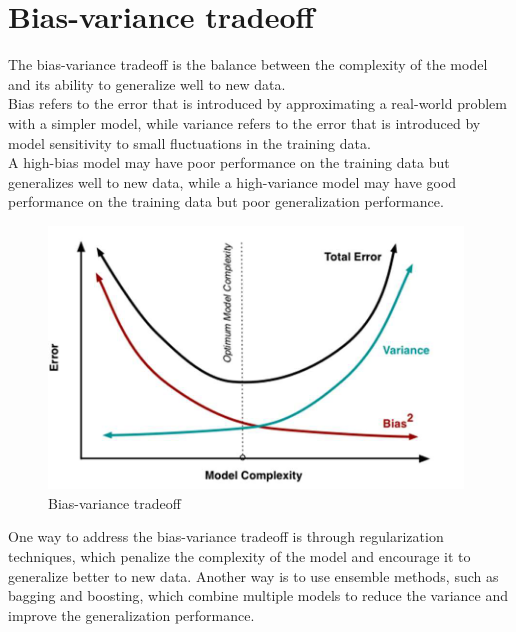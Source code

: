 \documentclass{article}
\begin{document}
\section{Bias-variance tradeoff}
The bias-variance tradeoff is the balance between the complexity of the model and its ability to generalize well to new data.\\
Bias refers to the error that is introduced by approximating a real-world problem with a simpler model, while variance refers to the error that is introduced by model sensitivity to small fluctuations in the training data.\\
A high-bias model may have poor performance on the training data but generalizes well to new data, while a high-variance model may have good performance on the training data but poor generalization performance.\\
\begin{figure}[!ht]
    \centering
    \includegraphics[width=11cm]{./images/p118_img552.png}
    \caption{Bias-variance tradeoff}
\end{figure}

\noindent One way to address the bias-variance tradeoff is through regularization techniques, which penalize the complexity of the model and encourage it to generalize better to new data. Another way is to use ensemble methods, such as bagging and boosting, which combine multiple models to reduce the variance and improve the generalization performance.
\end{document}

